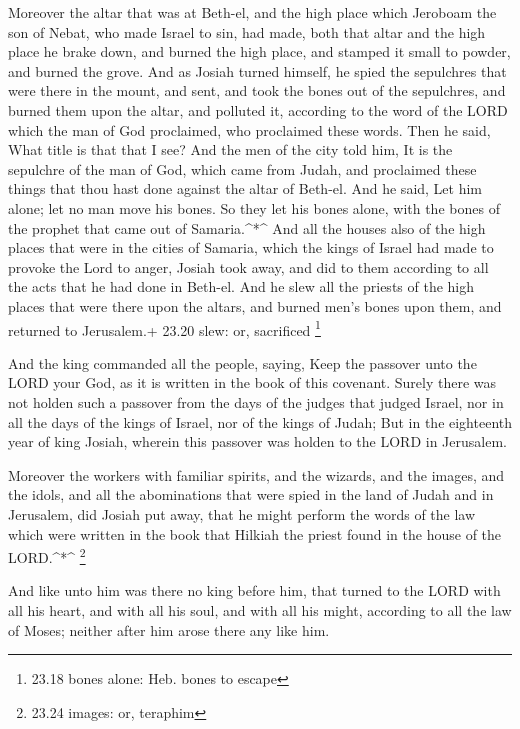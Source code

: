  Moreover the altar that was at Beth-el, and the high place
which Jeroboam the son of Nebat, who made Israel to sin, had made, both
that altar and the high place he brake down, and burned the high place,
and stamped it small to powder, and burned the grove.  And
as Josiah turned himself, he spied the sepulchres that were there in the
mount, and sent, and took the bones out of the sepulchres, and burned
them upon the altar, and polluted it, according to the word of the LORD
which the man of God proclaimed, who proclaimed these words.
 Then he said, What title is that that I see? And the men
of the city told him, It is the sepulchre of the man of God, which came
from Judah, and proclaimed these things that thou hast done against the
altar of Beth-el.  And he said, Let him alone; let no man
move his bones. So they let his bones alone, with the bones of the
prophet that came out of Samaria.\^{}*\^{}  And all the
houses also of the high places that were in the cities of Samaria, which
the kings of Israel had made to provoke the Lord to anger, Josiah took
away, and did to them according to all the acts that he had done in
Beth-el.  And he slew all the priests of the high places
that were there upon the altars, and burned men's bones upon them, and
returned to Jerusalem.+ 23.20 slew: or, sacrificed \footnote{23.18 bones
  alone: Heb. bones to escape}

 And the king commanded all the people, saying, Keep the
passover unto the LORD your God, as it is written in the book of this
covenant.  Surely there was not holden such a passover from
the days of the judges that judged Israel, nor in all the days of the
kings of Israel, nor of the kings of Judah;  But in the
eighteenth year of king Josiah, wherein this passover was holden to the
LORD in Jerusalem.

 Moreover the workers with familiar spirits, and the
wizards, and the images, and the idols, and all the abominations that
were spied in the land of Judah and in Jerusalem, did Josiah put away,
that he might perform the words of the law which were written in the
book that Hilkiah the priest found in the house of the LORD.\^{}*\^{}
\footnote{23.24 images: or, teraphim}

 And like unto him was there no king before him, that
turned to the LORD with all his heart, and with all his soul, and with
all his might, according to all the law of Moses; neither after him
arose there any like him.

